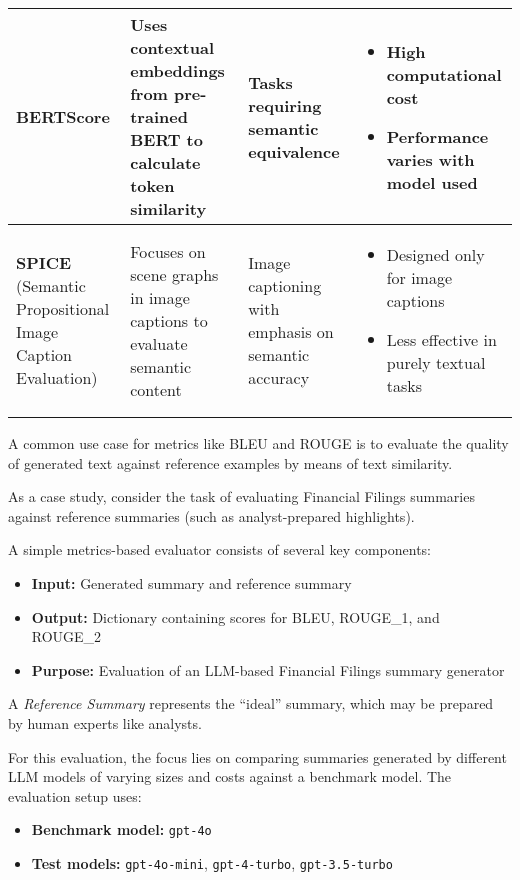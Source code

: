 \begin{table*}[htbp]
\begin{tabular}{p{}p{}p{}p{}}
\hline
\textbf{BERTScore} & Uses contextual embeddings from pre-trained BERT to calculate token similarity & Tasks requiring semantic equivalence & \begin{itemize}\item High computational cost\item Performance varies with model used\end{itemize} \\
\hline
\textbf{SPICE} (Semantic Propositional Image Caption Evaluation) & Focuses on scene graphs in image captions to evaluate semantic content & Image captioning with emphasis on semantic accuracy & \begin{itemize}\item Designed only for image captions\item Less effective in purely textual tasks\end{itemize} \\
\hline
\end{tabular}
\end{table*}

A common use case for metrics like BLEU and ROUGE is to evaluate the quality of generated text against reference examples by means of text similarity. 

As a case study, consider the task of evaluating Financial Filings summaries against reference summaries (such as analyst-prepared highlights).

A simple metrics-based evaluator consists of several key components:
\begin{itemize}
    \item \textbf{Input:} Generated summary and reference summary
    \item \textbf{Output:} Dictionary containing scores for BLEU, ROUGE\_1, and ROUGE\_2
    \item \textbf{Purpose:} Evaluation of an LLM-based Financial Filings summary generator
\end{itemize}

A \textit{Reference Summary} represents the ``ideal'' summary, which may be prepared by human experts like analysts.

For this evaluation, the focus lies on comparing summaries generated by different LLM models of varying sizes and costs against a benchmark model. The evaluation setup uses:

\begin{itemize}
    \item \textbf{Benchmark model:} \texttt{gpt-4o}
    \item \textbf{Test models:} \texttt{gpt-4o-mini}, \texttt{gpt-4-turbo}, \texttt{gpt-3.5-turbo}
\end{itemize}

